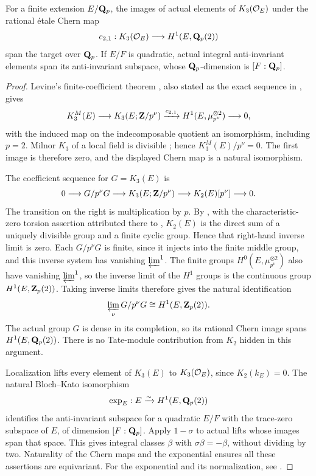 \begin{lemma}\label{d3:lem:actuallocal}
For a finite extension $E/\mathbf Q_p$, the images of actual elements of $K_3(\mathcal O_E)$ under the rational \'etale Chern map
\[
c_{2,1}:K_3(\mathcal O_E)\longrightarrow H^1(E,\mathbf Q_p(2))
\]
span the target over $\mathbf Q_p$. If $E/F$ is quadratic, actual integral anti-invariant elements span its anti-invariant subspace, whose $\mathbf Q_p$-dimension is $[F:\mathbf Q_p]$.
\end{lemma}
\begin{proof}
Levine's finite-coefficient theorem \cite[Theorem~4.12]{LevineIndK3}, also stated as the exact sequence in \cite[Section~5]{WeibelChern}, gives
\[
K_3^M(E)\longrightarrow K_3(E;\mathbf Z/p^\nu)
\xrightarrow{c_{2,1}}H^1(E,\mu_{p^\nu}^{\otimes2})\longrightarrow0,
\]
with the induced map on the indecomposable quotient an isomorphism, including $p=2$. Milnor $K_3$ of a local field is divisible \cite[Chapter~III, Exercise~7.4]{Weibel}; hence $K_3^M(E)/p^\nu=0$. The first image is therefore zero, and the displayed Chern map is a natural isomorphism.

The coefficient sequence for $G=K_3(E)$ is
\cite[IV, Section~2]{Weibel}
\[
0\longrightarrow G/p^\nu G\longrightarrow K_3(E;\mathbf Z/p^\nu)
\longrightarrow K_2(E)[p^\nu]\longrightarrow0.
\]
The transition on the right is multiplication by $p$. By \cite[III, Theorem~6.2.4]{Weibel}, with the characteristic-zero torsion assertion attributed there to \cite{MerkurjevTorsion}, $K_2(E)$ is the direct sum of a uniquely divisible group and a finite cyclic group. Hence that right-hand inverse limit is zero. Each $G/p^\nu G$ is finite, since it injects into the finite middle group, and this inverse system has vanishing $\varprojlim^1$. The finite groups $H^0(E,\mu_{p^\nu}^{\otimes2})$ also have vanishing $\varprojlim^1$, so the inverse limit of the $H^1$ groups is the continuous group $H^1(E,\mathbf Z_p(2))$. Taking inverse limits therefore gives the natural identification
\[
\varprojlim_\nu G/p^\nu G\cong H^1(E,\mathbf Z_p(2)).
\]
The actual group $G$ is dense in its completion, so its rational Chern image spans $H^1(E,\mathbf Q_p(2))$. There is no Tate-module contribution from $K_2$ hidden in this argument.

Localization lifts every element of $K_3(E)$ to $K_3(\mathcal O_E)$, since $K_2(k_E)=0$. The natural Bloch--Kato isomorphism
\[
\exp_E:E\xrightarrow{\sim}H^1(E,\mathbf Q_p(2))
\]
identifies the anti-invariant subspace for a quadratic $E/F$ with the trace-zero subspace of $E$, of dimension $[F:\mathbf Q_p]$. Apply $1-\sigma$ to actual lifts whose images span that space. This gives integral classes $\beta$ with $\sigma\beta=-\beta$, without dividing by two. Naturality of the Chern maps and the exponential ensures all these assertions are equivariant. For the exponential and its normalization, see \cite[Section~1.3]{HuberKings}.
\end{proof}

